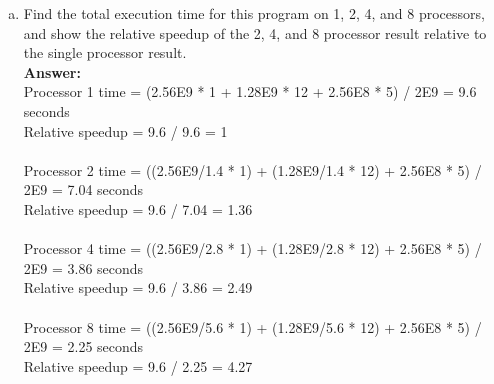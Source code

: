 \documentclass[12pt]{article}
\begin{document}
\begin{enumerate}[(a)]
    \item Find the total execution time for this program on 1, 2, 4, and 8 processors, and show the relative speedup of the 2, 4, and 8 processor result relative to the single processor result.
    \\
    \textbf{Answer:}
    \\
    Processor 1 time = (2.56E9 * 1 + 1.28E9 * 12 + 2.56E8 * 5) / 2E9 = 9.6 seconds\\
    Relative speedup = 9.6 / 9.6 = 1\\
    \\
    Processor 2 time = ((2.56E9/1.4 * 1) + (1.28E9/1.4 * 12) + 2.56E8 * 5) / 2E9 = 7.04 seconds\\
    Relative speedup = 9.6 / 7.04 = 1.36\\
    \\
    Processor 4 time = ((2.56E9/2.8 * 1) + (1.28E9/2.8 * 12) + 2.56E8 * 5) / 2E9 = 3.86 seconds\\
    Relative speedup = 9.6 / 3.86 = 2.49\\
    \\
    Processor 8 time = ((2.56E9/5.6 * 1) + (1.28E9/5.6 * 12) + 2.56E8 * 5) / 2E9 = 2.25 seconds\\
    Relative speedup = 9.6 / 2.25 = 4.27\\


\end{enumerate}
\end{document}
